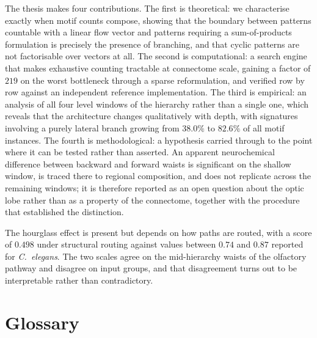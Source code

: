 \documentclass[12pt,a4paper,oneside]{article}
\theoremstyle{definition}
\theoremstyle{plain}
\begin{document}
The thesis makes four contributions. The first is theoretical: we
characterise exactly when motif counts compose, showing that the boundary
between patterns countable with a linear flow vector and patterns requiring
a sum-of-products formulation is precisely the presence of branching, and
that cyclic patterns are not factorisable over vectors at all. The second is
computational: a search engine that makes exhaustive counting tractable at
connectome scale, gaining a factor of $219$ on the worst bottleneck through
a sparse reformulation, and verified row by row against an independent
reference implementation. The third is empirical: an analysis of all four
level windows of the hierarchy rather than a single one, which reveals that
the architecture changes qualitatively with depth, with signatures involving
a purely lateral branch growing from $38.0\%$ to $82.6\%$ of all motif
instances.
The fourth is methodological: a hypothesis carried through to the point
where it can be tested rather than asserted. An apparent neurochemical
difference between backward and forward waists is significant on the shallow
window, is traced there to regional composition, and does not replicate
across the remaining windows; it is therefore reported as an open question
about the optic lobe rather than as a property of the connectome, together
with the procedure that established the distinction.

The hourglass effect is present but depends on how paths are routed, with a
score of $0.498$ under structural routing against values between $0.74$ and
$0.87$ reported for \textit{C.\ elegans}. The two scales agree on the
mid-hierarchy waists of the olfactory pathway and disagree on input groups,
and that disagreement turns out to be interpretable rather than
contradictory.

\clearpage

\tableofcontents
\clearpage
\listoffigures
\clearpage
\listoftables
\clearpage

\section*{Glossary}
\end{document}
